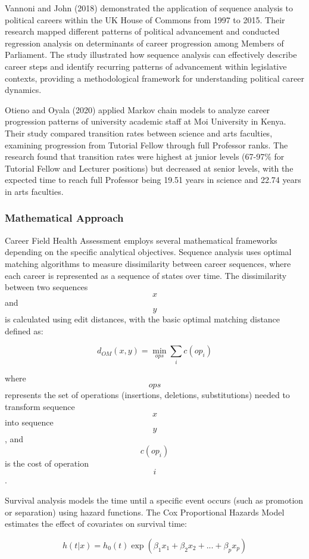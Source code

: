 \documentclass[main.tex]{subfiles}
\begin{document}
Vannoni and John (2018) demonstrated the application of sequence analysis to political careers within the UK House of Commons from 1997 to 2015. Their research mapped different patterns of political advancement and conducted regression analysis on determinants of career progression among Members of Parliament. The study illustrated how sequence analysis can effectively describe career steps and identify recurring patterns of advancement within legislative contexts, providing a methodological framework for understanding political career dynamics\cite{vannoni2018}.

Otieno and Oyala (2020) applied Markov chain models to analyze career progression patterns of university academic staff at Moi University in Kenya. Their study compared transition rates between science and arts faculties, examining progression from Tutorial Fellow through full Professor ranks. The research found that transition rates were highest at junior levels (67-97\% for Tutorial Fellow and Lecturer positions) but decreased at senior levels, with the expected time to reach full Professor being 19.51 years in science and 22.74 years in arts faculties\cite{otieno2020}.

\subsubsection{Mathematical Approach}

Career Field Health Assessment employs several mathematical frameworks depending on the specific analytical objectives. Sequence analysis uses optimal matching algorithms to measure dissimilarity between career sequences, where each career is represented as a sequence of states over time. The dissimilarity between two sequences $$x$$ and $$y$$ is calculated using edit distances, with the basic optimal matching distance defined as:

$$d_{OM}(x,y) = \min_{ops} \sum_{i} c(op_i)$$

where $$ops$$ represents the set of operations (insertions, deletions, substitutions) needed to transform sequence $$x$$ into sequence $$y$$, and $$c(op_i)$$ is the cost of operation $$i$$\cite{abbott1995}.

Survival analysis models the time until a specific event occurs (such as promotion or separation) using hazard functions. The Cox Proportional Hazards Model estimates the effect of covariates on survival time:

$$h(t|x) = h_0(t) \exp(\beta_1 x_1 + \beta_2 x_2 + ... + \beta_p x_p)$$
\end{document}
